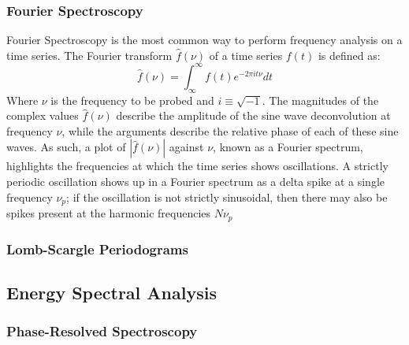 \subsubsection{Fourier Spectroscopy}

\par Fourier Spectroscopy \citep{Fourier} is the most common way to perform frequency analysis on a time series.  The Fourier transform $\hat{f}(\nu)$ of a time series $f(t)$ is defined as:
\begin{equation}
\hat{f}(\nu)=\int_\infty^\infty f(t)e^{-2\pi it\nu} dt
\end{equation}
Where $\nu$ is the frequency to be probed and $i\equiv\sqrt{-1}$.  The magnitudes of the complex values $\hat{f}(\nu)$ describe the amplitude of the sine wave deconvolution at frequency $\nu$, while the arguments describe the relative phase of each of these sine waves.  As such, a plot of $|\hat{f}(\nu)|$ against $\nu$, known as a Fourier spectrum, highlights the frequencies at which the time series shows oscillations.  A strictly periodic oscillation shows up in a Fourier spectrum as a delta spike at a single frequency $\nu_p$; if the oscillation is not strictly sinusoidal, then there may also be spikes present at the harmonic frequencies $N\nu_p$

\subsubsection{Lomb-Scargle Periodograms}

\subsection{Energy Spectral Analysis}

\subsubsection{Phase-Resolved Spectroscopy}
\label{sec:phasresspec}

